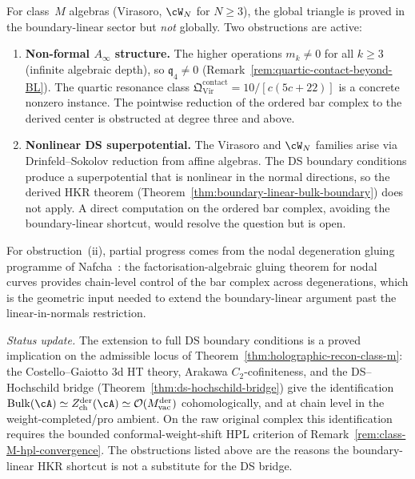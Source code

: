 \begin{remark}%
\label{rem:class-M-global-triangle-gap}%
%
%
For class~$M$ algebras (Virasoro, $\cW_N$ for $N \geq 3$), the
global triangle is proved in the boundary-linear sector but
\emph{not} globally. Two obstructions are active:
\begin{enumerate}[label=(\roman*)]
\item \textbf{Non-formal $A_\infty$ structure.}
 The higher operations $m_k \neq 0$ for all $k \geq 3$
 (infinite algebraic depth), so
 $\mathfrak{q}_4 \neq 0$
 (Remark~\ref{rem:quartic-contact-beyond-BL}).
 The quartic resonance class
 $\mathfrak{Q}^{\mathrm{contact}}_{\mathrm{Vir}} =
 10/[c(5c+22)]$ is a concrete nonzero instance.
 The pointwise reduction of the ordered bar complex to
 the derived center is obstructed at degree three and above.

\item \textbf{Nonlinear DS superpotential.}
 The Virasoro and $\cW_N$ families arise via Drinfeld--Sokolov
 reduction from affine algebras. The DS boundary conditions
 produce a superpotential that is nonlinear in the normal
 directions, so the derived HKR theorem
 (Theorem~\ref{thm:boundary-linear-bulk-boundary}) does not
 apply. A direct computation on the ordered bar complex,
 avoiding the boundary-linear shortcut, would resolve the
 question but is open.
\end{enumerate}

For obstruction~(ii), partial progress comes from the
nodal degeneration gluing programme of
Nafcha~\cite{Nafcha26}: the factorisation-algebraic
gluing theorem for nodal curves provides chain-level
control of the bar complex across degenerations, which
is the geometric input needed to extend the boundary-linear
argument past the linear-in-normals restriction.

\emph{Status update.} The extension to full DS boundary conditions is a
proved implication on the admissible locus of
Theorem~\ref{thm:holographic-recon-class-m}: the Costello--Gaiotto
$3$d HT theory, Arakawa $C_2$-cofiniteness, and the DS--Hochschild
bridge (Theorem~\ref{thm:ds-hochschild-bridge}) give
the identification
$\mathrm{Bulk}(\cA)\simeq
Z^{\mathrm{der}}_{\mathrm{ch}}(\cA)\simeq
\mathcal{O}(M_{\mathrm{vac}}^{\mathrm{der}})$
cohomologically, and at chain level in the weight-completed/pro
ambient. On the raw original complex this identification requires the
bounded conformal-weight-shift HPL criterion of
Remark~\ref{rem:class-M-hpl-convergence}. The obstructions listed
above are the reasons the boundary-linear HKR shortcut is not a
substitute for the DS bridge.
\end{remark}

